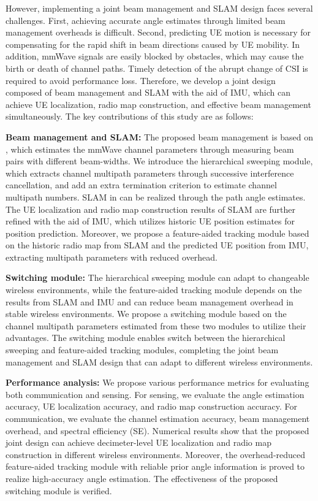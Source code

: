 \documentclass[journal,12pt,onecolumn,draftclsnofoot,]{IEEEtran}
\begin{document}
However, implementing a joint beam management and SLAM design faces several challenges. 
First, achieving accurate angle estimates through limited beam management overheads is difficult. 
Second, predicting UE motion is necessary for compensating for the rapid shift in beam directions caused by UE mobility. In addition, mmWave signals are easily blocked by obstacles, which may cause the birth or death of channel paths. 
Timely detection of the abrupt change of CSI is required to avoid performance loss. 
Therefore, we develop a joint design composed of beam management and SLAM with the aid of IMU, which can achieve UE localization, radio map construction, and effective beam management simultaneously. The key contributions of this study are as follows: 

\begin{itemize}
{\color{black}
\item \textbf{Beam management and SLAM:} 
The proposed beam management is based on \cite{a12}, which estimates the mmWave channel parameters through measuring beam pairs with different beam-widths. 
We introduce the hierarchical sweeping module, which extracts channel multipath parameters through successive interference cancellation, and add an extra termination criterion to estimate channel multipath numbers. 
SLAM in \cite{a6} can be realized through the path angle estimates. The UE localization and radio map construction results of SLAM are further refined with the aid of IMU, which utilizes historic UE position estimates for position prediction. 
Moreover, we propose a feature-aided tracking module based on the historic radio map from SLAM and the predicted UE position from IMU, extracting multipath parameters with reduced overhead. 

\item \textbf{Switching module:} 
The hierarchical sweeping module can adapt to changeable wireless environments, while the feature-aided tracking module depends on the results from SLAM and IMU and can reduce beam management overhead in stable wireless environments. 
We propose a switching module based on the channel multipath parameters estimated from these two modules to utilize their advantages. 
The switching module enables switch between the hierarchical sweeping and feature-aided tracking modules, completing the joint beam management and SLAM design that can adapt to different wireless environments. 

\item \textbf{Performance analysis:} 
We propose various performance metrics for evaluating both communication and sensing. 
For sensing, we evaluate the angle estimation accuracy, UE localization accuracy, and radio map construction accuracy. 
For communication, we evaluate the channel estimation accuracy, beam management overhead, and spectral efficiency (SE). 
Numerical results show that the proposed joint design can achieve decimeter-level UE localization and radio map construction in different wireless environments. 
Moreover, the overhead-reduced feature-aided tracking module with reliable prior angle information is proved to realize high-accuracy angle estimation. The effectiveness of the proposed switching module is verified.
}
\end{itemize}
\end{document}
